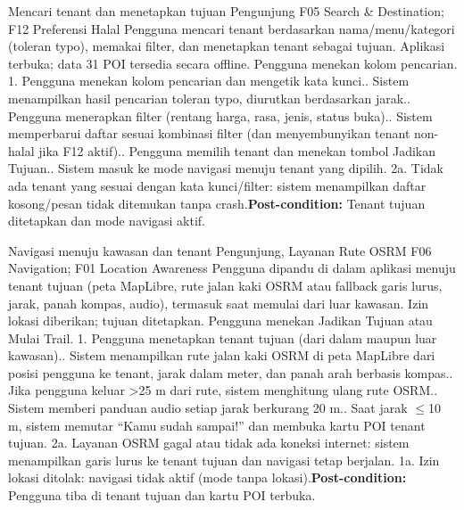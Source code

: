 {Mencari tenant dan menetapkan tujuan}
{Pengunjung}
{F05 Search \& Destination; F12 Preferensi Halal}
{Pengguna mencari tenant berdasarkan nama/menu/kategori (toleran typo), memakai filter, dan menetapkan tenant sebagai tujuan.}
{Aplikasi terbuka; data 31 POI tersedia secara offline.}
{Pengguna menekan kolom pencarian.}
{1. Pengguna menekan kolom pencarian dan mengetik kata kunci.. Sistem menampilkan hasil pencarian toleran typo, diurutkan berdasarkan jarak.. Pengguna menerapkan filter (rentang harga, rasa, jenis, status buka).. Sistem memperbarui daftar sesuai kombinasi filter (dan menyembunyikan tenant non-halal jika F12 aktif).. Pengguna memilih tenant dan menekan tombol Jadikan Tujuan.. Sistem masuk ke mode navigasi menuju tenant yang dipilih.}
{2a. Tidak ada tenant yang sesuai dengan kata kunci/filter: sistem menampilkan daftar kosong/pesan tidak ditemukan tanpa crash.\newline\textbf{Post-condition:} Tenant tujuan ditetapkan dan mode navigasi aktif.}

{Navigasi menuju kawasan dan tenant}
{Pengunjung, Layanan Rute OSRM}
{F06 Navigation; F01 Location Awareness}
{Pengguna dipandu di dalam aplikasi menuju tenant tujuan (peta MapLibre, rute jalan kaki OSRM atau fallback garis lurus, jarak, panah kompas, audio), termasuk saat memulai dari luar kawasan.}
{Izin lokasi diberikan; tujuan ditetapkan.}
{Pengguna menekan Jadikan Tujuan atau Mulai Trail.}
{1. Pengguna menetapkan tenant tujuan (dari dalam maupun luar kawasan).. Sistem menampilkan rute jalan kaki OSRM di peta MapLibre dari posisi pengguna ke tenant, jarak dalam meter, dan panah arah berbasis kompas.. Jika pengguna keluar >25 m dari rute, sistem menghitung ulang rute OSRM.. Sistem memberi panduan audio setiap jarak berkurang 20 m.. Saat jarak \(\le\)10 m, sistem memutar ``Kamu sudah sampai!'' dan membuka kartu POI tenant tujuan.}
{2a. Layanan OSRM gagal atau tidak ada koneksi internet: sistem menampilkan garis lurus ke tenant tujuan dan navigasi tetap berjalan.\newline
1a. Izin lokasi ditolak: navigasi tidak aktif (mode tanpa lokasi).\newline\textbf{Post-condition:} Pengguna tiba di tenant tujuan dan kartu POI terbuka.}

